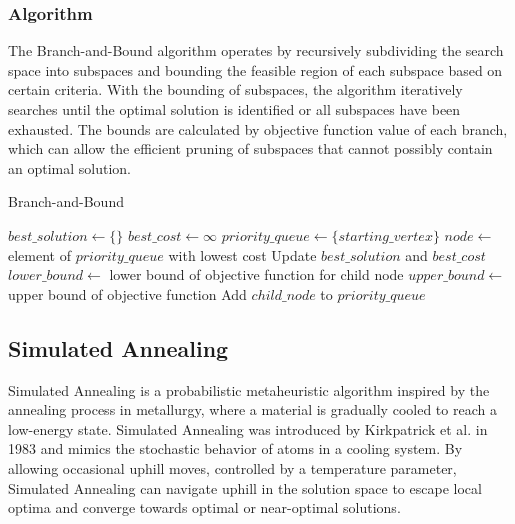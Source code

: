 \documentclass{article}
\begin{document}
\subsubsection{Algorithm}
The Branch-and-Bound algorithm operates by recursively subdividing the search space into subspaces and bounding the feasible region of each subspace based on certain criteria. With the bounding of subspaces, the algorithm iteratively searches until the optimal solution is identified or all subspaces have been exhausted. The bounds are calculated by objective function value of each branch, which can allow the efficient pruning of subspaces that cannot possibly contain an optimal solution.

\begin{algorithm}[!h]
    \DontPrintSemicolon
    \caption{Branch-and-Bound}
    \label{alg:bnb}

    $best\_solution\gets\{\}$\;
    $best\_cost\gets \infty$\;
    $priority\_queue\gets\{starting\_vertex\}$\;
    {
        $node \gets$ element of $priority\_queue$ with lowest cost\;
        {
            {
                Update $best\_solution$ and $best\_cost$\;
            }
        }
        \Else
        {
            {
                {
                    $lower\_bound \gets $ lower bound of objective function for child node\;
                    $upper\_bound\gets$ upper bound of objective function\;
                    {
                        Add $child\_node$ to $priority\_queue$\;
                    }
                }
            }
        }
    }
    \;
\end{algorithm}
\newpage



\subsection{Simulated Annealing}
Simulated Annealing is a probabilistic metaheuristic algorithm inspired by the annealing process in metallurgy, where a material is gradually cooled to reach a low-energy state. Simulated Annealing was introduced by Kirkpatrick et al. in 1983 and mimics the stochastic behavior of atoms in a cooling system. By allowing occasional uphill moves, controlled by a temperature parameter, Simulated Annealing can navigate uphill in the solution space to escape local optima and converge towards optimal or near-optimal solutions.
\end{document}
